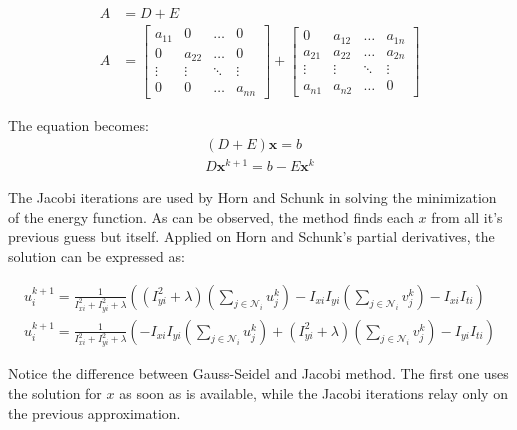 \documentclass[12pt,a4paper,twoside]{report}
\begin{document}
\begin{equation}
	\begin{split}
	A &= D + E \\
	A &= 
		\begin{bmatrix}
			a_{11} &  0  & \ldots & 0\\
				0	 &  a_{22} & \ldots & 0\\
			\vdots & \vdots & \ddots & \vdots\\
			0   &  0      &\ldots & a_{nn}
		\end{bmatrix}
		+
		\begin{bmatrix}
			0 &  a_{12}  & \ldots & a_{1n}\\
			a_{21} &  a_{22} & \ldots & a_{2n}\\
			\vdots & \vdots & \ddots & \vdots\\
			a_{n1} &  a_{n2}       &\ldots & 0
		\end{bmatrix}
	\end{split}
\end{equation}

The equation becomes:
\begin{equation}
\begin{split}
(D+E)\boldsymbol{x} = b\\
D\boldsymbol{x}^{k+1} = b - E\boldsymbol{x}^{k}
\end{split}
\end{equation}

The Jacobi iterations are used by Horn and Schunk in solving the minimization of the energy function. As can be observed, the method finds each $x$ from all it's previous guess but itself. Applied on Horn and Schunk's partial derivatives, the solution can be expressed as:

\begin{equation} \label{JEq}
\begin{split}
u^{k+1}_i = \frac{1}{I_{xi}^2+I_{yi}^2+ \lambda}
\left(
(I_{yi}^2+\lambda)(\sum_{j \in \mathcal{N}_i} u_j^{k})
-I_{xi}I_{yi}(\sum_{j \in \mathcal{N}_i} v_j^{k})
-I_{xi}I_{ti}
\right)
\\
u^{k+1}_i = \frac{1}{I_{xi}^2+I_{yi}^2+ \lambda}
\left(
-I_{xi}I_{yi}(\sum_{j \in \mathcal{N}_i} u_j^{k})
+(I_{yi}^2+\lambda)(\sum_{j \in \mathcal{N}_i} v_j^{k})
-I_{yi}I_{ti}
\right)
\end{split}
\end{equation}

Notice the difference between Gauss-Seidel and Jacobi method. The first one uses the solution for $x$ as soon as is available, while the Jacobi iterations relay only on the previous approximation.
\end{document}
